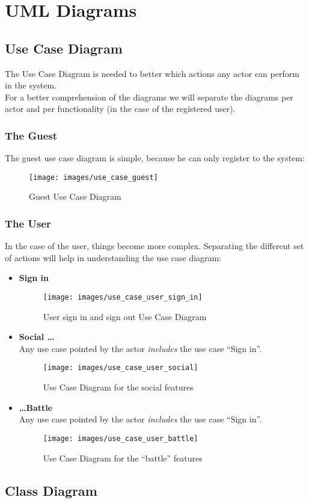 \chapter{UML Diagrams}
	\section{Use Case Diagram}
	The Use Case Diagram is needed to better which actions any actor can perform in the  system.\\
	For a better comprehension of the diagrams we will separate the diagrams per actor and per functionality (in the case of the registered user).
\newpage
		\subsection{The Guest}
		The guest use case diagram is simple, because he can only register to the system:

		\begin{figure}[H]
			\centering
			\texttt{[image: images/use\_case\_guest]}
			\caption{Guest Use Case Diagram}
			\label{fig:use_case_guest}
		\end{figure}
\newpage
		\subsection{The User}
		In the case of the user, things become more complex. Separating the different set of actions will help in understanding the use case diagram:
		\begin{itemize}
		 	\item \textbf{Sign in}
			\begin{figure}[H]
				\centering
				\texttt{[image: images/use\_case\_user\_sign\_in]}
				\caption{User sign in and sign out Use Case Diagram}
				\label{fig:use_case_user_sign_in}
			\end{figure}
\newpage
			\item \textbf{Social \ldots} \hfill \\
			Any use case pointed by the actor \textit{includes} the use case ``Sign in''.
			\begin{figure}[H]
				\centering
				\texttt{[image: images/use\_case\_user\_social]}
				\caption{Use Case Diagram for the social features}
				\label{fig:use_case_user_social}
			\end{figure}
\newpage
			\item \textbf{\ldots Battle} \hfill \\
			Any use case pointed by the actor \textit{includes} the use case ``Sign in''.
			\begin{figure}[H]
				\centering
				\texttt{[image: images/use\_case\_user\_battle]}
				\caption{Use Case Diagram for the ``battle'' features}
				\label{fig:use_case_user_battle}
			\end{figure}
		\end{itemize} 
\newpage
	\section{Class Diagram}